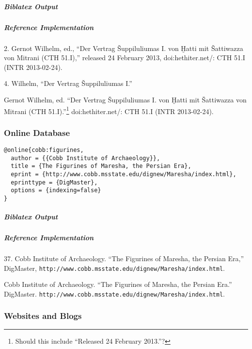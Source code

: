 \documentclass[a4paper]{article}
\newenvironment{biboutput}{%
  \subparagraph{Biblatex Output}
}{\color{black}}
\newenvironment{refimp}{%
  \subparagraph{Reference Implementation}
  \color{reference-colour}
  \rm
}{\par\color{black}}
\begin{document}
\begin{biboutput}
\end{biboutput}

\begin{refimp}
  \hspace*{\bibindent}2. Gernot Wilhelm, ed., “Der Vertrag Šuppiluliumas I.
  von Ḫatti mit Šattiwazza von Mitrani (CTH 51.I),” released 24 February 2013,
  doi:hethiter.net/: CTH 51.I (INTR 2013-02-24).

  \hspace*{\bibindent}4. Wilhelm, “Der Vertrag Šuppiluliumas I.”

  \hangindent\bibindent Gernot Wilhelm, ed. “Der Vertrag Šuppiluliumas I. von
  Ḫatti mit Šattiwazza von Mitrani (CTH 51.I).”\footnote{Should this include
  “Released 24 February 2013.”?} doi:hethiter.net/: CTH 51.I
  (INTR 2013-02-24).
\end{refimp}

\subsubsection{Online Database}

\begin{lstlisting}
@online{cobb:figurines,
  author = {{Cobb Institute of Archaeology}},
  title = {The Figurines of Maresha, the Persian Era},
  eprint = {http://www.cobb.msstate.edu/dignew/Maresha/index.html},
  eprinttype = {DigMaster},
  options = {indexing=false}
}
\end{lstlisting}

\begin{biboutput}
\end{biboutput}

\begin{refimp}
  \hspace*{\bibindent}37. Cobb Institute of Archaeology. “The Figurines of
  Maresha, the Persian Era,” DigMaster,
  \nolinkurl{http://www.cobb.msstate.edu/dignew/Maresha/index.html}.

  \hangindent\bibindent Cobb Institute of Archaeology. “The Figurines of
  Maresha, the Persian Era.” DigMaster.
  \nolinkurl{http://www.cobb.msstate.edu/dignew/Maresha/index.html}.
\end{refimp}

\subsubsection{Websites and Blogs}
\end{document}
